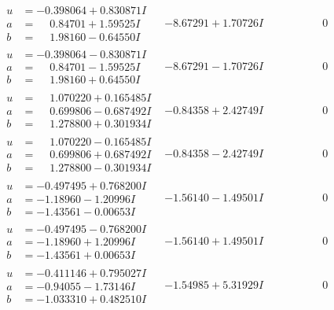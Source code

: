 \documentclass[1p]{elsarticle_modified}
\theoremstyle{definition}
\begin{document}
$$\begin{array}{c|c|c}
\begin{aligned}
u &= -0.398064 + 0.830871 I \\
a &= \phantom{-}0.84701 + 1.59525 I \\
b &= \phantom{-}1.98160 - 0.64550 I\end{aligned}
 & -8.67291 + 1.70726 I & \phantom{-0.000000 } 0 \\ \hline\begin{aligned}
u &= -0.398064 - 0.830871 I \\
a &= \phantom{-}0.84701 - 1.59525 I \\
b &= \phantom{-}1.98160 + 0.64550 I\end{aligned}
 & -8.67291 - 1.70726 I & \phantom{-0.000000 } 0 \\ \hline\begin{aligned}
u &= \phantom{-}1.070220 + 0.165485 I \\
a &= \phantom{-}0.699806 - 0.687492 I \\
b &= \phantom{-}1.278800 + 0.301934 I\end{aligned}
 & -0.84358 + 2.42749 I & \phantom{-0.000000 } 0 \\ \hline\begin{aligned}
u &= \phantom{-}1.070220 - 0.165485 I \\
a &= \phantom{-}0.699806 + 0.687492 I \\
b &= \phantom{-}1.278800 - 0.301934 I\end{aligned}
 & -0.84358 - 2.42749 I & \phantom{-0.000000 } 0 \\ \hline\begin{aligned}
u &= -0.497495 + 0.768200 I \\
a &= -1.18960 - 1.20996 I \\
b &= -1.43561 - 0.00653 I\end{aligned}
 & -1.56140 - 1.49501 I & \phantom{-0.000000 } 0 \\ \hline\begin{aligned}
u &= -0.497495 - 0.768200 I \\
a &= -1.18960 + 1.20996 I \\
b &= -1.43561 + 0.00653 I\end{aligned}
 & -1.56140 + 1.49501 I & \phantom{-0.000000 } 0 \\ \hline\begin{aligned}
u &= -0.411146 + 0.795027 I \\
a &= -0.94055 - 1.73146 I \\
b &= -1.033310 + 0.482510 I\end{aligned}
 & -1.54985 + 5.31929 I & \phantom{-0.000000 } 0 \\ \hline\begin{aligned}

\end{aligned}
\end{array}$$
\end{document}
